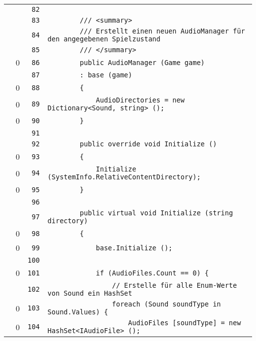\documentclass[a4paper,10pt]{article}
\begin{document}
\begin{longtable}[l]{lrrl}
\cellcolor{gray} &  & \verb~82~ & \verb~~\\
\cellcolor{gray} &  & \verb~83~ & \verb~        /// <summary>~\\
\cellcolor{gray} &  & \verb~84~ & \verb~        /// Erstellt einen neuen AudioManager für den angegebenen Spielzustand~\\
\cellcolor{gray} &  & \verb~85~ & \verb~        /// </summary>~\\
\cellcolor{red} & 0 & \verb~86~ & \verb~        public AudioManager (Game game)~\\
\cellcolor{gray} &  & \verb~87~ & \verb~        : base (game)~\\
\cellcolor{red} & 0 & \verb~88~ & \verb~        {~\\
\cellcolor{red} & 0 & \verb~89~ & \verb~            AudioDirectories = new Dictionary<Sound, string> ();~\\
\cellcolor{red} & 0 & \verb~90~ & \verb~        }~\\
\cellcolor{gray} &  & \verb~91~ & \verb~~\\
\cellcolor{gray} &  & \verb~92~ & \verb~        public override void Initialize ()~\\
\cellcolor{red} & 0 & \verb~93~ & \verb~        {~\\
\cellcolor{red} & 0 & \verb~94~ & \verb~            Initialize (SystemInfo.RelativeContentDirectory);~\\
\cellcolor{red} & 0 & \verb~95~ & \verb~        }~\\
\cellcolor{gray} &  & \verb~96~ & \verb~~\\
\cellcolor{gray} &  & \verb~97~ & \verb~        public virtual void Initialize (string directory)~\\
\cellcolor{red} & 0 & \verb~98~ & \verb~        {~\\
\cellcolor{red} & 0 & \verb~99~ & \verb~            base.Initialize ();~\\
\cellcolor{gray} &  & \verb~100~ & \verb~~\\
\cellcolor{red} & 0 & \verb~101~ & \verb~            if (AudioFiles.Count == 0) {~\\
\cellcolor{gray} &  & \verb~102~ & \verb~                // Erstelle für alle Enum-Werte von Sound ein HashSet~\\
\cellcolor{red} & 0 & \verb~103~ & \verb~                foreach (Sound soundType in Sound.Values) {~\\
\cellcolor{red} & 0 & \verb~104~ & \verb~                    AudioFiles [soundType] = new HashSet<IAudioFile> ();~\\

\end{longtable}
\end{document}
